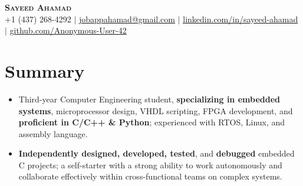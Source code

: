\documentclass[letterpaper,11pt]{article}
\newcommand{\resumeItem}[1]{
  \item\small{
    {#1 \vspace{-2pt}}
  }
}
\newcommand{\spaceReducer}{ %
    \vspace{-0.5cm}
}
\newcommand{\resumeItemListStart}{\begin{itemize}}
\newcommand{\resumeItemListEnd}{\end{itemize}\vspace{-5pt}}
\begin{document}

\begin{center}
    \textbf{\Huge \scshape Sayeed Ahamad} \\ \vspace{1pt}
    \small +1 (437) 268-4292 $|$ \href{mailto:jobappahamad@gmail.com}{\underline{jobappahamad@gmail.com}} $|$ 
    \href{https://linkedin.com/in/sayeed-ahamad}{\underline{linkedin.com/in/sayeed-ahamad}} $|$
    \href{https://github.com/Anonymous-User-42}{\underline{github.com/Anonymous-User-42}}
\end{center}



\section{Summary}
    \resumeItemListStart
        \resumeItem{Third-year Computer Engineering student, \textbf{specializing in embedded systems}, microprocessor design, VHDL scripting, FPGA development, and \textbf{proficient in C/C++ \& Python}; experienced with RTOS, Linux, and assembly language.}
        \resumeItem{\textbf{Independently designed, developed, tested}, and \textbf{debugged} embedded C projects; a self-starter with a strong ability to work autonomously and collaborate effectively within cross-functional teams on complex systems.}
    \resumeItemListEnd
    \spaceReducer
\end{document}
